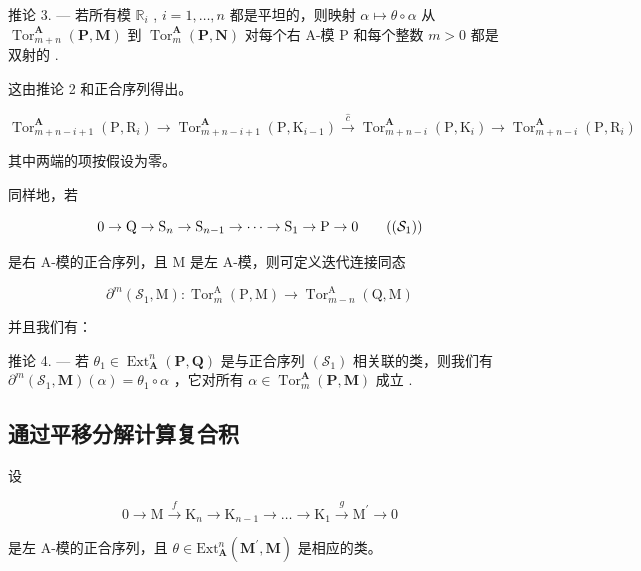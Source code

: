 推论 3. --- 若所有模 \(\mathbb{R}_i\) , \(i = 1, \ldots, n\) 都是平坦的，则映射 \(\alpha \mapsto \theta \circ \alpha\) 从 \(\operatorname{Tor}_{m+n}^{\mathbf{A}}(\mathbf{P}, \mathbf{M})\) 到 \(\operatorname{Tor}_m^{\mathbf{A}}(\mathbf{P}, \mathbf{N})\) 对每个右 A-模 P 和每个整数 \(m > 0\) 都是双射的 .

这由推论 2 和正合序列得出。

\[
\operatorname{Tor} _ {m + n - i + 1} ^ {\mathbf {A}} \left(\mathrm{P}, \mathrm{R} _ {i}\right)\rightarrow \operatorname{Tor} _ {m + n - i + 1} ^ {\mathbf {A}} \left(\mathrm{P}, \mathrm{K} _ {i - 1}\right) \xrightarrow {\hat {c}} \operatorname{Tor} _ {m + n - i} ^ {\mathbf {A}} \left(\mathrm{P}, \mathrm{K} _ {i}\right)\rightarrow \operatorname{Tor} _ {m + n - i} ^ {\mathbf {A}} \left(\mathrm{P}, \mathrm{R} _ {i}\right)
\]

其中两端的项按假设为零。

同样地，若

\[
0 \rightarrow \mathrm{Q} \rightarrow \mathrm{S} _ {n} \rightarrow \mathrm{S} _ {n - 1} \rightarrow \dots \rightarrow \mathrm{S} _ {1} \rightarrow \mathrm{P} \rightarrow 0\tag{$(\mathcal{S}_1)$}
\]

是右 A-模的正合序列，且 M 是左 A-模，则可定义迭代连接同态

\[
\partial^ {m} (\mathcal {S} _ {1}, \mathrm{M}): \operatorname{Tor} _ {m} ^ {\mathrm{A}} (\mathrm{P}, \mathrm{M}) \rightarrow \operatorname{Tor} _ {m - n} ^ {\mathrm{A}} (\mathrm{Q}, \mathrm{M})
\]

并且我们有：

推论 4. --- 若 \(\theta_{1} \in \operatorname{Ext}_{\mathbf{A}}^{n}(\mathbf{P}, \mathbf{Q})\) 是与正合序列 \((\mathcal{S}_{1})\) 相关联的类，则我们有 \(\partial^{m}(\mathcal{S}_{1}, \mathbf{M})(\alpha) = \theta_{1} \circ \alpha\) ，它对所有 \(\alpha \in \operatorname{Tor}_{m}^{\mathbf{A}}(\mathbf{P}, \mathbf{M})\) 成立 .

\subsection{通过平移分解计算复合积}

设

\[
0 \rightarrow \mathrm{M} \xrightarrow {f} \mathrm{K} _ {n} \rightarrow \mathrm{K} _ {n - 1} \rightarrow \dots \rightarrow \mathrm{K} _ {1} \xrightarrow {g} \mathrm{M} ^ {\prime} \rightarrow 0\tag{16}
\]

是左 A-模的正合序列，且 \(\theta\in\mathrm{Ext}_{\mathbf{A}}^{n}(\mathbf{M}^{\prime},\mathbf{M})\) 是相应的类。


